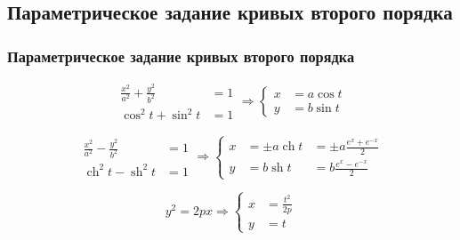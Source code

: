 \documentclass[10pt]{beamer}
\begin{document}
    \subsection{Параметрическое задание кривых второго порядка}
    \begin{frame}
        \frametitle{Параметрическое задание кривых второго порядка}
        \begin{equation*}
            \begin{aligned}
                \frac{x^2}{a^2} + \frac{y^2}{b^2} & =1 \\
                \cos^2 t + \sin^2 t & =1 
            \end{aligned}
            \Longrightarrow
            \left\{
            \begin{aligned}
                x & = a \cos t \\
                y & = b \sin t 
            \end{aligned}
            \right.
        \end{equation*}

        \noindent\makebox[\linewidth]{\rule{\textwidth}{0.4pt}}

        \begin{equation*}
            \begin{aligned}
                \frac{x^2}{a^2} - \frac{y^2}{b^2} & =1 \\
                \operatorname{ch}^2 t - \operatorname{sh}^2 t & =1 
            \end{aligned}
            \Longrightarrow
            \left\{
            \begin{aligned}
                x & = \pm a \operatorname{ch} t & = \pm a\frac{e^x+e^{-x}}{2} \\
                y & = b \operatorname{sh} t & = b\frac{e^x-e^{-x}}{2} 
            \end{aligned}
            \right.
        \end{equation*}

        \noindent\makebox[\linewidth]{\rule{\textwidth}{0.4pt}}

        \begin{equation*}
            y^2 = 2px
            \Longrightarrow
            \left\{
            \begin{aligned}
                x & = \frac{t^2}{2p} \\
                y & = t 
            \end{aligned}
            \right.
        \end{equation*}
    \end{frame}
\end{document}
